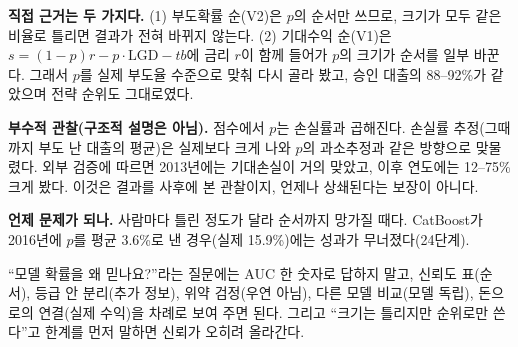 \begin{whybox}
\textbf{직접 근거는 두 가지다.} (1) 부도확률 순(V2)은 $p$의 순서만 쓰므로, 크기가 모두 같은 비율로 틀리면 결과가 전혀 바뀌지 않는다. (2) 기대수익 순(V1)은 $s=(1-p)r-p\cdot\mathrm{LGD}-tb$에 금리 $r$이 함께 들어가 $p$의 크기가 순서를 일부 바꾼다. 그래서 $p$를 실제 부도율 수준으로 맞춰 다시 골라 봤고, 승인 대출의 88--92\%가 같았으며 전략 순위도 그대로였다.

\textbf{부수적 관찰(구조적 설명은 아님).} 점수에서 $p$는 손실률과 곱해진다. 손실률 추정(그때까지 부도 난 대출의 평균)은 실제보다 크게 나와 $p$의 과소추정과 같은 방향으로 맞물렸다. 외부 검증에 따르면 2013년에는 기대손실이 거의 맞았고, 이후 연도에는 12--75\% 크게 봤다. 이것은 결과를 사후에 본 관찰이지, 언제나 상쇄된다는 보장이 아니다.

\textbf{언제 문제가 되나.} 사람마다 틀린 정도가 달라 순서까지 망가질 때다. CatBoost가 2016년에 $p$를 평균 3.6\%로 낸 경우(실제 15.9\%)에는 성과가 무너졌다(24단계).
\end{whybox}

\begin{career}
``모델 확률을 왜 믿나요?''라는 질문에는 AUC 한 숫자로 답하지 말고, 신뢰도 표(순서), 등급 안 분리(추가 정보), 위약 검정(우연 아님), 다른 모델 비교(모델 독립), 돈으로의 연결(실제 수익)을 차례로 보여 주면 된다. 그리고 ``크기는 틀리지만 순위로만 쓴다''고 한계를 먼저 말하면 신뢰가 오히려 올라간다.
\end{career}
